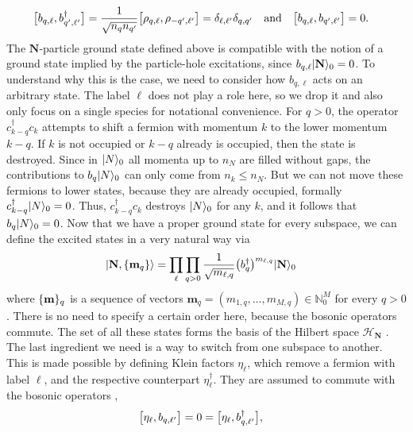 \begin{align*}
\klb[\big]{b_{q,\ell}, b_{q',\ell'}^\dagger} &= \frac{1}{\sqrt{n_q n_{q'}}} \klb[\big]{\rho_{q,\ell}, \rho_{-q',\ell'}} = \delta_{\ell,\ell'} \delta_{q,q'} \quad \text{and} \quad \klb[\big]{b_{q,\ell}, b_{q',\ell'}} = 0.
\end{align*}
The $\textbf{N}$-particle ground state defined above is compatible with the notion of a ground state implied by the particle-hole excitations, since $b_{q,\ell} \Ket{\textbf{N}}_0 = 0$.
To understand why this is the case, we need to consider how $b_{q,\ell}$ acts on an arbitrary state. 
The label $\ell$ does not play a role here, so we drop it and also only focus on a single species for notational convenience.
For $q>0$, the operator $c_{k-q}^\dagger c_{k}$ attempts to shift a fermion with momentum $k$ to the lower momentum $k-q$.
If $k$ is not occupied or $k-q$ already is occupied, then the state is destroyed.
Since in $\Ket{N}_0$ all momenta up to $n_N$ are filled without gaps, the contributions to $b_q\Ket{N}_0$ can only come from $n_k \le n_N$.
But we can not move these fermions to lower states, because they are already occupied, formally $c_{k-q}^\dagger \Ket{N}_0 = 0$.
Thus, $c_{k-q}^\dagger c_{k}$ destroys $\Ket{N}_0$ for any $k$, and it follows that $b_q\Ket{N}_0=0$.
Now that we have a proper ground state for every subspace, we can define the excited states in a very natural way via
\begin{align}
\Ket{\textbf{N},\klc{\textbf{m}_q}} &= \prod_\ell \prod_{q>0} \frac{1}{\sqrt{m_{\ell,q}}} \kla[\big]{b_q^\dagger}^{m_{\ell,q}} \Ket{\textbf{N}}_0
\end{align}
where $\klc{\textbf{m}}_q$ is a sequence of vectors $\textbf{m}_q = (m_{1,q}, \dots, m_{M,q}) \in \mathbb{N}_0^M$ for every $q>0$.
There is no need to specify a certain order here, because the bosonic operators commute.
The set of all these states forms the basis of the Hilbert space $\mathcal{H}_\textbf{N}$ \cite{Bosonization_DelftSchoeller_1998}.\\
The last ingredient we need is a way to switch from one subspace to another.
This is made possible by defining Klein factors $\eta_\ell$, which remove a fermion with label $\ell$, and the respective counterpart $\eta_\ell^\dagger$.
They are assumed to commute with the bosonic operators \cite[\ssec 4.F]{Bosonization_DelftSchoeller_1998},
\begin{align*}
\klb[\big]{\eta_\ell, b_{q,\ell'}} &= 0 = \klb[\big]{\eta_\ell, b_{q,\ell'}^\dagger},
\end{align*}
